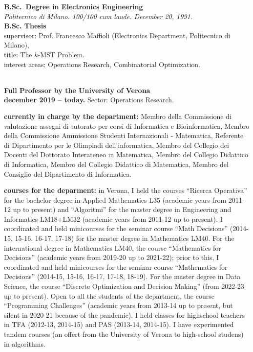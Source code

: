 \documentclass[10pt]{article}
\newcommand{\voice}[1] { \bigskip \medskip \noindent {\Large \bf #1} \medskip\\ }
\newcommand{\subvoice}[1] { {\large \bf #1} \smallskip\\ }
\newcommand{\emp}[1] { {\em #1}\\ }
\begin{document}
\subvoice{B.Sc.~Degree in Electronics Engineering}
\emp{Politecnico di Milano. 100/100 cum laude. December 20, 1991.}

\subvoice{B.Sc. Thesis}
{\sc supervisor:} Prof. Francesco Maffioli (Electronics Department,   
                Politecnico di Milano), \\
{\sc title:} The $k$-MST Problem.\\
{\sc interest areas:} Operations Research, Combinatorial Optimization.\\


\vspace{1.8mm}

\voice{{\LARGE Present employment}}

\subvoice{Full Professor by the
          University of Verona}
{\bf december 2019 -- today.}
Sector: Operations Research.

{\bf currently in charge by the department:} Membro della Commissione di valutazione assegni di tutorato per corsi di Informatica e Bioinformatica, Membro della Commissione Ammissione Studenti
Internazionali - Matematica, Referente di Dipartimento per le Olimpiadi dell'informatica, Membro del Collegio dei Docenti del Dottorato Interateneo in Matematica, Membro del Collegio Didattico di Informatica, Membro del Collegio Didattico di Matematica, Membro del Consiglio del Dipartimento di Informatica.

{\bf courses for the deparment:} in Verona,
I held the courses ``Ricerca Operativa''
for the bachelor degree in Applied Mathematics L35 (academic years from 2011-12 up to present)
and ``Algoritmi'' for the master degree in Engineering and Informatics LM18+LM32 (academic years from 2011-12 up to present).
I coordinated and held minicourses for the seminar course ``Math Decisions'' (2014-15, 15-16, 16-17, 17-18) for the master degree in Mathematics LM40. 
For the international degree in Mathematics LM40, the course ``Mathematics for Decisions'' (academic years from 2019-20 up to 2021-22); prior to this, I coordinated and held minicourses for the seminar course ``Mathematics for Decisions'' (2014-15, 15-16, 16-17, 17-18, 18-19).
For the master degree in Data Science, the course ``Discrete Optimization and Decision Making'' (from 2022-23 up to present).
Open to all the students of the department, the course ``Programming Challenges'' (academic years from 2013-14 up to present, but silent in 2020-21 because of the pandemic).
I held classes for highschool teachers in TFA (2012-13, 2014-15) and PAS (2013-14, 2014-15).
I have experimented tandem courses (an offert from the University of Verona to high-school studens) in algorithms.
\end{document}
